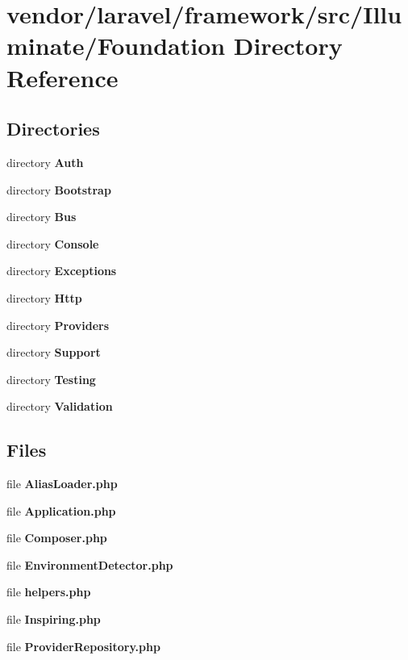 \section{vendor/laravel/framework/src/\+Illuminate/\+Foundation Directory Reference}
\label{dir_bed744fb49a19c9abffd03fa5b2dfeb1}
\subsection*{Directories}
\begin{DoxyCompactItemize}
\item 
directory {\bf Auth}
\item 
directory {\bf Bootstrap}
\item 
directory {\bf Bus}
\item 
directory {\bf Console}
\item 
directory {\bf Exceptions}
\item 
directory {\bf Http}
\item 
directory {\bf Providers}
\item 
directory {\bf Support}
\item 
directory {\bf Testing}
\item 
directory {\bf Validation}
\end{DoxyCompactItemize}
\subsection*{Files}
\begin{DoxyCompactItemize}
\item 
file {\bf Alias\+Loader.\+php}
\item 
file {\bf Application.\+php}
\item 
file {\bf Composer.\+php}
\item 
file {\bf Environment\+Detector.\+php}
\item 
file {\bf helpers.\+php}
\item 
file {\bf Inspiring.\+php}
\item 
file {\bf Provider\+Repository.\+php}
\end{DoxyCompactItemize}
